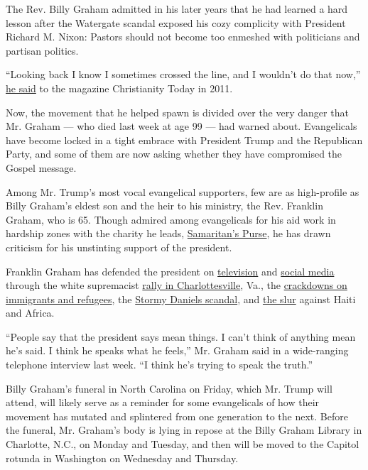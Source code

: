 The Rev. Billy Graham admitted in his later years that he had learned a
hard lesson after the Watergate scandal exposed his cozy complicity with
President Richard M. Nixon: Pastors should not become too enmeshed with
politicians and partisan politics.

``Looking back I know I sometimes crossed the line, and I wouldn't do
that now,''
\href{http://www.christianitytoday.com/ct/2011/januaryweb-only/qabillygraham.html}{he
said} to the magazine Christianity Today in 2011.

Now, the movement that he helped spawn is divided over the very danger
that Mr. Graham --- who died last week at age 99 --- had warned about.
Evangelicals have become locked in a tight embrace with President Trump
and the Republican Party, and some of them are now asking whether they
have compromised the Gospel message.

Among Mr. Trump's most vocal evangelical supporters, few are as
high-profile as Billy Graham's eldest son and the heir to his ministry,
the Rev. Franklin Graham, who is 65. Though admired among evangelicals
for his aid work in hardship zones with the charity he leads,
\href{https://www.samaritanspurse.org/}{Samaritan's Purse}, he has drawn
criticism for his unstinting support of the president.

Franklin Graham has defended the president on
\href{https://www.cnn.com/2018/01/24/politics/graham-evangelicals-support-trump-don-lemon-cnntv/index.html}{television}
and \href{https://www.facebookcorewwwi.onion/FranklinGraham/}{social
media} through the white supremacist
\href{https://twitter.com/franklin_graham/status/896878033147244545?lang=en}{rally
in Charlottesville}, Va., the
\href{https://www.facebookcorewwwi.onion/FranklinGraham/posts/1394064260649751}{crackdowns
on immigrants and refugees}, the
\href{https://www.nbcnews.com/politics/donald-trump/evangelist-franklin-graham-defends-trump-against-stormy-daniels-reports-n839496}{Stormy
Daniels scandal}, and
\href{http://thehill.com/blogs/blog-briefing-room/news/369399-franklin-graham-defends-trumps-sh-hole-comments-hes-being}{the
slur} against Haiti and Africa.

``People say that the president says mean things. I can't think of
anything mean he's said. I think he speaks what he feels,'' Mr. Graham
said in a wide-ranging telephone interview last week. ``I think he's
trying to speak the truth.''

Billy Graham's funeral in North Carolina on Friday, which Mr. Trump will
attend, will likely serve as a reminder for some evangelicals of how
their movement has mutated and splintered from one generation to the
next. Before the funeral, Mr. Graham's body is lying in repose at the
Billy Graham Library in Charlotte, N.C., on Monday and Tuesday, and then
will be moved to the Capitol rotunda in Washington on Wednesday and
Thursday.

